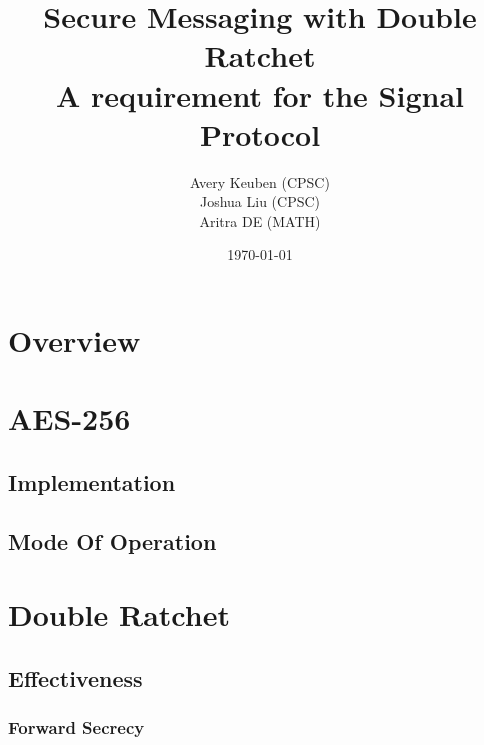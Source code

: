 

\title{Secure Messaging with Double Ratchet\\ A requirement for the Signal Protocol}
\author{Avery Keuben (CPSC)\\ Joshua Liu (CPSC)\\ Aritra DE (MATH)}
\date{\today}
  


\maketitle

\newpage

\section{Overview}


\section{AES-256}


\subsection{Implementation}


\subsection{Mode Of Operation}







\section{Double Ratchet}


\subsection{Effectiveness}


\subsubsection{Forward Secrecy}


